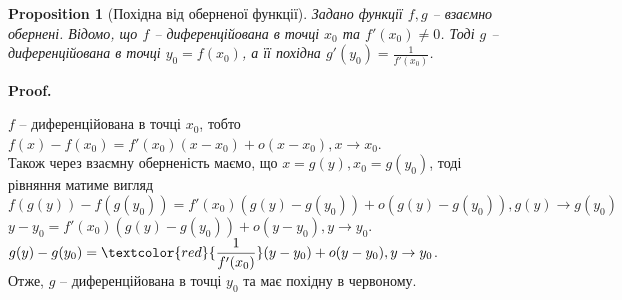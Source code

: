 \documentclass[a4paper, 14pt]{article}
\makeatletter
\def\qed{$\blacksquare$}
\theoremstyle{theoremdd}
\theoremstyle{theoremdd}
\theoremstyle{theoremdd}
\theoremstyle{theoremdd}
\theoremstyle{theoremdd}
\newtheorem{proposition}[theorem]{Proposition}
\theoremstyle{theoremdd}
\theoremstyle{theoremdd}
\theoremstyle{theoremdd}
\renewenvironment{proof}[1][Proof.\\]{\par
\pushQED{\hfill \qed}%
\normalfont \topsep6\p@\@plus6\p@\relax
\trivlist
\item\relax
{\bfseries
#1\@addpunct{.}}\hspace\labelsep\ignorespaces
}{%
\popQED\endtrivlist\@endpefalse
}
\makeatother
\begin{document}
\iffalse
\begin{proof}
$h'(x) = \displaystyle \lim_{x \to x_0} \frac{h(x)-h(x_0)}{x-x_0} = \lim_{x \to x_0} \frac{g(f(x))-g(f(x_0))}{x-x_0} = \lim_{x \to x_0} \frac{g(f(x))-g(f(x_0))}{f(x)-f(x_0)} \frac{f(x)-f(x_0)}{x-x_0} \boxed{=}$\\
Розіб'ємо дві дроби на окремі границі. В першому дробі заміна: $y=f(x)$\\
Якщо $x \to x_0$, то в силу диференційованості, а внаслідок - неперервності, $f(x) \to f(x_0)$ або $y \to y_0$.\\
$\boxed{=} \displaystyle \lim_{y \to y_0} \frac{g(y)-g(y_0)}{y-y_0} \lim_{x \to x_0} \frac{f(x)-f(x_0)}{x-x_0}= g'(y_0) f'(x_0)=g'(f(x_0))f'(x_0) \\ \Rightarrow h$ - диференційована в т. $x_0$.
\end{proof}
\fi

\begin{proposition}[Похідна від оберненої функції]
Задано функції $f,g$ -- взаємно обернені. Відомо, що $f$ -- диференційована в точці $x_0$ та $f'(x_0) \neq 0$. Тоді $g$ -- диференційована в точці $y_0 = f(x_0)$, а її похідна 
$g'(y_0) = \displaystyle \frac{1}{f'(x_0)}$.
\end{proposition}

\begin{proof}
$f$ -- диференційована в точці $x_0$, тобто $f(x)-f(x_0)=f'(x_0)(x-x_0)+o(x-x_0), x \to x_0$.\\
Також через взаємну оберненість маємо, що $x = g(y), x_0 = g(y_0)$, тоді рівняння матиме вигляд\\
$f(g(y))-f(g(y_0)) = f'(x_0)(g(y)-g(y_0)) + o(g(y)-g(y_0)), g(y) \to g(y_0)$\\
$y-y_0 = f'(x_0)(g(y)-g(y_0)) + o(y-y_0), y \to y_0$.\\
$g(y)-g(y_0) = \textcolor{red}{\dfrac{1}{f'(x_0)}}(y-y_0) + o(y-y_0), y \to y_0$.\\
Отже, $g$ -- диференційована в точці $y_0$ та має похідну в червоному.
\end{proof}

\iffalse
\begin{proof}
$g'(y_0) = \displaystyle \lim_{y \to y_0} \frac{g(y)-g(y_0)}{y-y_0} \boxed{=}$\\
Заміна: $y = f(x)$. Через взаємну оберненість $g(y)=g(f(x))=x$. Якщо $y \to y_0$, то $g(y) \to g(y_0) \Rightarrow x \to x_0$.\\
$\boxed{=} \displaystyle \lim_{x \to x_0}\frac{x-x_0}{f(x)-f(x_0)} = \frac{1}{f'(x_0)} \\ \Rightarrow g$ - диференційована в т. $y_0$.
\end{proof}
\fi
\end{document}
